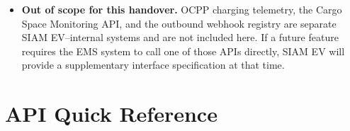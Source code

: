 \documentclass{article}
\begin{document}
\begin{itemize}[leftmargin=*]
          --- it does not call the OCPP API, does not need to validate the
          IDs, and does not need connector-level detail (session state,
          connector status, etc.); that detail lives entirely in the OCPP
          charging system, which is out of scope for this document.
    \item \textbf{Out of scope for this handover.} OCPP charging telemetry, the
          Cargo Space Monitoring API, and the outbound webhook registry are
          separate SIAM EV--internal systems and are not included here. If a
          future feature requires the EMS system to call one of those APIs
          directly, SIAM EV will provide a supplementary interface
          specification at that time.
\end{itemize}

\newpage

\section{API Quick Reference}
\end{document}
